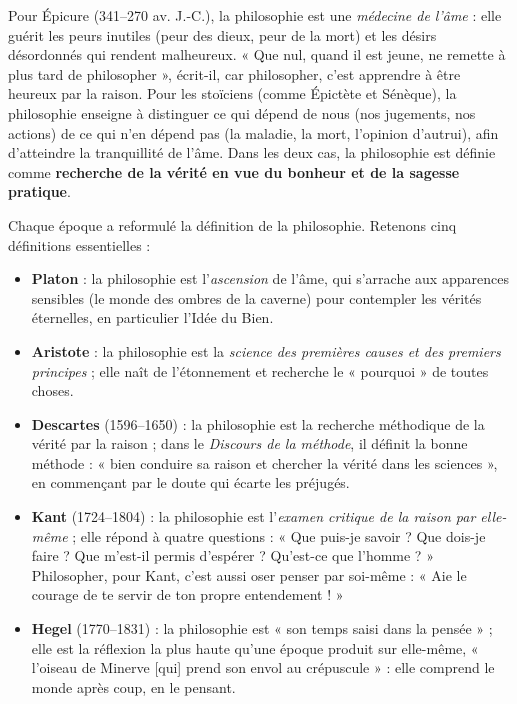 \documentclass[11pt]{article}
\newcommand{\cle}[1]{{\popxbold\color{popdark}#1}}
\newcounter{popsec}
\newcounter{popsub}
\newcommand{\courssub}[1]{%
  \stepcounter{popsub}%
  \par\vspace{9pt}\noindent{\popxbold\fontsize{11.5}{13}\selectfont\color{popink}{\color{poporange}\thepopsec.\thepopsub}\hspace{6pt}#1}\par\nopagebreak\vspace{4pt}
}
\begin{document}
Pour \cle{Épicure} (341--270 av. J.-C.), la philosophie est une \emph{médecine de l'âme} : elle guérit les peurs inutiles (peur des dieux, peur de la mort) et les désirs désordonnés qui rendent malheureux. « Que nul, quand il est jeune, ne remette à plus tard de philosopher », écrit-il, car philosopher, c'est apprendre à être heureux par la raison. Pour les \cle{stoïciens} (comme Épictète et Sénèque), la philosophie enseigne à distinguer ce qui dépend de nous (nos jugements, nos actions) de ce qui n'en dépend pas (la maladie, la mort, l'opinion d'autrui), afin d'atteindre la tranquillité de l'âme. Dans les deux cas, la philosophie est définie comme \textbf{recherche de la vérité en vue du bonheur et de la sagesse pratique}.

\courssub{Les définitions des grands auteurs}

Chaque époque a reformulé la définition de la philosophie. Retenons cinq définitions essentielles :

\begin{itemize}
\item \textbf{Platon} : la philosophie est l'\emph{ascension} de l'âme, qui s'arrache aux apparences sensibles (le monde des ombres de la caverne) pour contempler les vérités éternelles, en particulier l'Idée du Bien.
\item \textbf{Aristote} : la philosophie est la \emph{science des premières causes et des premiers principes} ; elle naît de l'étonnement et recherche le « pourquoi » de toutes choses.
\item \textbf{Descartes} (1596--1650) : la philosophie est la recherche méthodique de la vérité par la raison ; dans le \emph{Discours de la méthode}, il définit la bonne méthode : « bien conduire sa raison et chercher la vérité dans les sciences », en commençant par le doute qui écarte les préjugés.
\item \textbf{Kant} (1724--1804) : la philosophie est l'\emph{examen critique de la raison par elle-même} ; elle répond à quatre questions : « Que puis-je savoir ? Que dois-je faire ? Que m'est-il permis d'espérer ? Qu'est-ce que l'homme ? » Philosopher, pour Kant, c'est aussi oser penser par soi-même : « Aie le courage de te servir de ton propre entendement ! »
\item \textbf{Hegel} (1770--1831) : la philosophie est « son temps saisi dans la pensée » ; elle est la réflexion la plus haute qu'une époque produit sur elle-même, « l'oiseau de Minerve [qui] prend son envol au crépuscule » : elle comprend le monde après coup, en le pensant.
\end{itemize}
\end{document}
